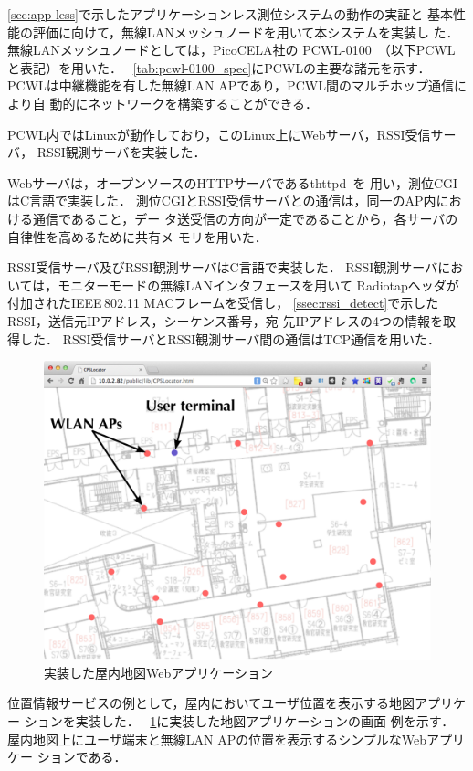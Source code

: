 \documentclass[technicalreport]{ieicej}
\begin{document}
\ref{sec:app-less}で示したアプリケーションレス測位システムの動作の実証と
基本性能の評価に向けて，無線LANメッシュノードを用いて本システムを実装し
た．
無線LANメッシュノードとしては，PicoCELA社の
PCWL-0100~\cite{picocela:pcwl-0100}（以下PCWLと表記）を用いた．
\tablename~\ref{tab:pcwl-0100_spec}にPCWLの主要な諸元を示す．
PCWLは中継機能を有した無線LAN APであり，PCWL間のマルチホップ通信により自
動的にネットワークを構築することができる．

PCWL内ではLinuxが動作しており，このLinux上にWebサーバ，RSSI受信サーバ，
RSSI観測サーバを実装した．

Webサーバは，オープンソースのHTTPサーバであるthttpd~\cite{acme:thttpd}を
用い，測位CGIはC言語で実装した．
測位CGIとRSSI受信サーバとの通信は，同一のAP内における通信であること，デー
タ送受信の方向が一定であることから，各サーバの自律性を高めるために共有メ
モリを用いた．

RSSI受信サーバ及びRSSI観測サーバはC言語で実装した．
RSSI観測サーバにおいては，モニターモードの無線LANインタフェースを用いて
Radiotapヘッダが付加されたIEEE\,802.11 MACフレームを受信し，
\ref{ssec:rssi_detect}で示したRSSI，送信元IPアドレス，シーケンス番号，宛
先IPアドレスの4つの情報を取得した．
RSSI受信サーバとRSSI観測サーバ間の通信はTCP通信を用いた．

\begin{figure}[bt]
 \centering
 \includegraphics[width=0.8\columnwidth]{figure/map_app.eps}
 \caption{実装した屋内地図Webアプリケーション}
 \label{fig:app_screenshot}
\end{figure}

位置情報サービスの例として，屋内においてユーザ位置を表示する地図アプリケー
ションを実装した．
\figurename~\ref{fig:app_screenshot}に実装した地図アプリケーションの画面
例を示す．
屋内地図上にユーザ端末と無線LAN APの位置を表示するシンプルなWebアプリケー
ションである．
\end{document}
